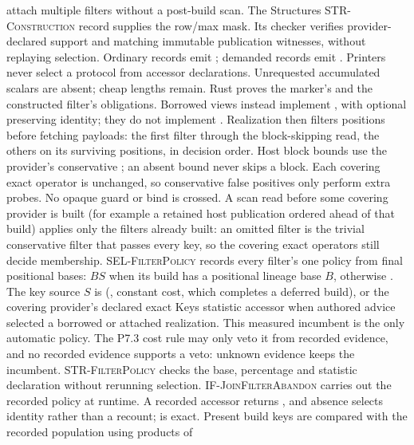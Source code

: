 attach multiple filters without a post-build  scan.
The Structures \textsc{STR-Construction} record supplies the row/max mask.
Its checker verifies provider-declared  support and
matching immutable publication witnesses, without replaying selection.
Ordinary records emit ; demanded records emit
. Printers never select a protocol from accessor
declarations. Unrequested accumulated scalars are absent; cheap lengths remain.
Rust proves the marker's  and the constructed filter's
 obligations. Borrowed views instead implement
, with optional  preserving identity;
they do not implement . Realization then
filters positions before fetching payloads: the first filter through the
block-skipping read, the others on its surviving positions, in decision order.
Host block bounds use the provider's conservative ; an absent bound
never skips a block. Each covering exact operator is unchanged, so conservative false
positives only perform extra probes. No opaque guard or bind is crossed.
A scan read before some covering provider is built (for example a retained
host publication ordered ahead of that build) applies only the filters already
built: an omitted filter is the trivial conservative filter that passes every
key, so the covering exact operators still decide membership.
\textsc{SEL-FilterPolicy} records every filter's one policy from final
positional bases: $B$$S$ when its
build has a positional lineage base $B$, otherwise . The key
source $S$ is  (, constant cost, which
completes a deferred build), or the covering provider's declared exact Keys
statistic accessor when authored advice selected a borrowed or attached
realization. This measured incumbent is the only automatic policy. The P7.3 cost
rule may only veto it from recorded evidence, and no recorded evidence supports
a veto: unknown evidence keeps the incumbent. \textsc{STR-FilterPolicy} checks
the base, percentage and statistic declaration without rerunning selection.
\textsc{IF-JoinFilterAbandon} carries out the recorded policy at runtime. A recorded
accessor returns , and absence selects identity rather than a
 recount;  is exact. Present build keys are
compared with the recorded population using  products of 

